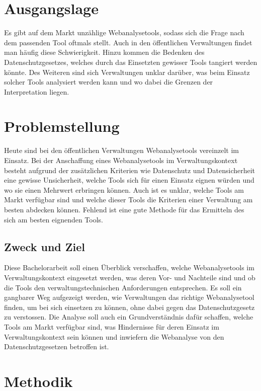
\section{Ausgangslage}
Es gibt auf dem Markt unzählige Webanalysetools, sodass sich die Frage nach dem passenden Tool oftmals stellt. Auch in den öffentlichen Verwaltungen findet man häufig diese Schwierigkeit. Hinzu kommen die Bedenken des Datenschutzgesetzes, welches durch das Einsetzten gewisser Tools tangiert werden könnte. Des Weiteren sind sich Verwaltungen unklar darüber, was beim Einsatz solcher Tools analysiert werden kann und wo dabei die Grenzen der Interpretation liegen.

\section{Problemstellung}

Heute sind bei den öffentlichen Verwaltungen Webanalysetools vereinzelt im Einsatz. Bei der Anschaffung eines Webanalysetools im Verwaltungskontext besteht aufgrund der zusätzlichen Kriterien wie Datenschutz und Datensicherheit eine gewisse Unsicherheit, welche Tools sich für einen Einsatz eignen würden und wo sie einen Mehrwert erbringen können. Auch ist es unklar, welche Tools am Markt verfügbar sind und welche dieser Tools die Kriterien einer Verwaltung am besten abdecken können. Fehlend ist eine gute Methode für das Ermitteln des sich am besten eignenden Tools.

\subsection{Zweck und Ziel}
Diese Bachelorarbeit soll einen Überblick verschaffen, welche Webanalysetools im Verwaltungskontext eingesetzt werden, was deren Vor- und Nachteile sind und ob die Tools den verwaltungstechnischen Anforderungen entsprechen. Es soll ein gangbarer Weg aufgezeigt werden, wie Verwaltungen das richtige Webanalysetool finden, um bei sich einsetzen zu können, ohne dabei gegen das Datenschutzgesetz zu verstossen. Die Analyse soll auch ein Grundverständnis dafür schaffen, welche Tools am Markt verfügbar sind, was Hindernisse für deren Einsatz im Verwaltungskontext sein können und inwiefern die Webanalyse von den Datenschutzgesetzen betroffen ist.


\section{Methodik}



